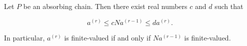Let $P$ be an absorbing chain. Then there exist real numbers $c$ and $d$ such that

$$a^{(r)} \leq cNa^{(r-1)} \leq da^{(r)}.$$

In particular, $a^{(r)}$ is finite-valued if and only if $Na^{(r-1)}$ is finite-valued.
